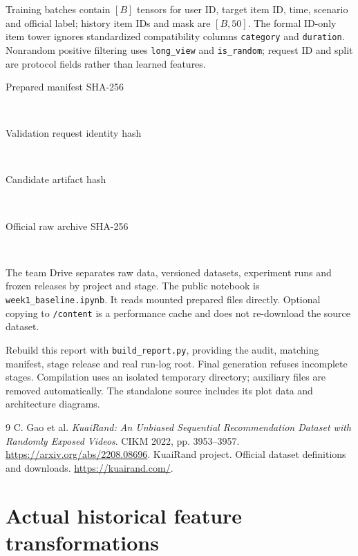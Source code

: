 \documentclass[11pt,a4paper]{article}
\begin{document}
Training batches contain $[B]$ tensors for user ID, target item ID, time, scenario and official label; history item IDs and mask are $[B,50]$. The formal ID-only item tower ignores standardized compatibility columns \texttt{category} and \texttt{duration}. Nonrandom positive filtering uses \texttt{long\_view} and \texttt{is\_random}; request ID and split are protocol fields rather than learned features.

\begin{description}
\item[Prepared manifest SHA-256] \hfill\\
\item[Validation request identity hash] \hfill\\
\item[Candidate artifact hash] \hfill\\
\item[Official raw archive SHA-256] \hfill\\
\end{description}

The team Drive separates raw data, versioned datasets, experiment runs and frozen releases by project and stage. The public notebook is \texttt{week1\_baseline.ipynb}. It reads mounted prepared files directly. Optional copying to \texttt{/content} is a performance cache and does not re-download the source dataset.

Rebuild this report with \texttt{build\_report.py}, providing the audit, matching manifest, stage release and real run-log root. Final generation refuses incomplete stages. Compilation uses an isolated temporary directory; auxiliary files are removed automatically. The standalone source includes its plot data and architecture diagrams.

\begin{thebibliography}{9}
 C. Gao et al. \emph{KuaiRand: An Unbiased Sequential Recommendation Dataset with Randomly Exposed Videos}. CIKM 2022, pp. 3953--3957. \url{https://arxiv.org/abs/2208.08696}.
 KuaiRand project. Official dataset definitions and downloads. \url{https://kuairand.com/}.
\end{thebibliography}

\clearpage\section{Actual historical feature transformations}
\end{document}
